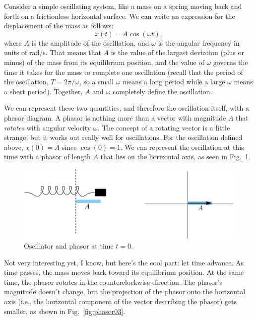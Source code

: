Consider a simple oscillating system, like a mass on a spring moving
back and forth on a frictionless horizontal surface.
We can write an expression for the displacement of the mass as follows:
\begin{equation}
x(t) = A\cos{(\omega t)},
\end{equation} 
where $A$ is the amplitude of the oscillation, and $\omega$ is the
angular frequency in units of rad/s. That means that $A$ is
the value of the largest deviation (plus or minus) of the mass from
its equilibrium position, and the value of $\omega$ governs the time it
takes for the mass to complete one oscillation (recall that the period
of the oscillation, $T = 2\pi/\omega$, so a small $\omega$
means a long period while a large $\omega$ means a short period).
Together, $A$ and $\omega$ completely define the oscillation.


We can represent these two quantities, and therefore the oscillation
itself, with a phasor diagram. A phasor is nothing more than a vector
with magnitude $A$ that {\em rotates} with angular velocity $\omega$. The
concept of a rotating vector is a little strange, but it works out really
well for oscillations.  For the oscillation defined above, $x(0) = A$
since $\cos{(0)} = 1$. We can represent the oscillation at this time
with a phasor of length $A$ that lies on the horizontal axis, as seen
in Fig.~\ref{fig:phasor02}.

\begin{figure}\begin{center}
 \includegraphics[width=4.0truein]{phasors/phasor02} 
\caption{\label{fig:phasor02}Oscillator and phasor at time $t=0$.}
\end{center}
\end{figure}

Not very interesting yet, I know, but here's the cool part: let time
advance.  As time passes, the mass moves back toward its equilibrium
position. At the same time, the phasor rotates in the counterclockwise
direction. The phasor's magnitude doesn't change, but the projection
of the phasor onto the horizontal axis (i.e., the horizontal
component of the vector describing the phasor) gets smaller, as 
shown in Fig.~\ref{fig:phasor03}.

